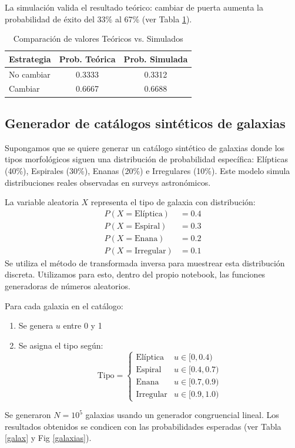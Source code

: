 \documentclass[baaa]{baaa}
\begin{document}
La simulación valida el resultado teórico: cambiar de puerta aumenta la probabilidad de éxito del 33\% al 67\% (ver Tabla \ref{monty}).

\begin{table}[h]
    \centering
    \small
    \caption{Comparación de valores Teóricos vs. Simulados}
    \begin{tabular}{lcc}
        \toprule
        Estrategia & Prob. Teórica & Prob. Simulada \\
        \midrule
        No cambiar & 0.3333 & 0.3312 \\
        Cambiar & 0.6667 & 0.6688 \\
        \bottomrule
    \end{tabular}
    \label{monty}
    \vspace{0.5em}
\end{table}

\subsection{Generador de catálogos sintéticos de galaxias}

Supongamos que se quiere generar un catálogo sintético de galaxias donde los tipos morfológicos siguen una distribución de probabilidad específica: Elípticas (40\%), Espirales (30\%), Enanas (20\%) e Irregulares (10\%). Este modelo simula distribuciones reales observadas en surveys astronómicos.

La variable aleatoria $X$ representa el tipo de galaxia con distribución:
\begin{align*}
P(X = \text{Elíptica}) &= 0.4 \\
P(X = \text{Espiral}) &= 0.3 \\
P(X = \text{Enana}) &= 0.2 \\
P(X = \text{Irregular}) &= 0.1
\end{align*}
Se utiliza el método de transformada inversa para muestrear esta distribución discreta. Utilizamos para esto, dentro del propio notebook, las funciones generadoras de números aleatorios.

Para cada galaxia en el catálogo:
\begin{enumerate}
    \item Se genera $u$ entre 0 y 1
    \item Se asigna el tipo según:
    \[
    \text{Tipo} = 
    \begin{cases}
    \text{Elíptica} & u \in [0, 0.4) \\
    \text{Espiral} & u \in [0.4, 0.7) \\
    \text{Enana} & u \in [0.7, 0.9) \\
    \text{Irregular} & u \in [0.9, 1.0)
    \end{cases}
    \]
\end{enumerate}
Se generaron $N = 10^5$ galaxias usando un generador congruencial lineal. Los resultados obtenidos se condicen con las probabilidades esperadas (ver Tabla \ref{galax} y Fig \ref{galaxias}).
\end{document}
